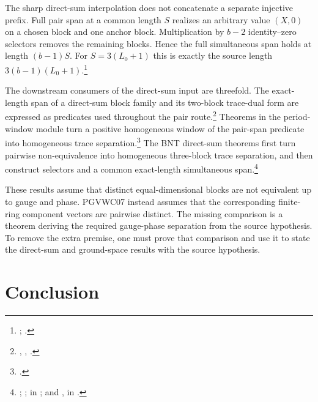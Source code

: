 \documentclass{article}
\begin{document}
The sharp direct-sum interpolation does not concatenate a separate injective
prefix. Full pair span at a common length $S$ realizes an arbitrary value
$(X,0)$ on a chosen block and one anchor block. Multiplication by $b-2$
identity--zero selectors removes the remaining blocks. Hence the full
simultaneous span holds at length $(b-1)S$. For
$S=3(L_0+1)$ this is exactly the source length
$3(b-1)(L_0+1)$.\footnote{%
;
.}

The downstream consumers of the direct-sum input are threefold. The exact-length
span of a direct-sum block family and its two-block trace-dual form are expressed
as predicates used throughout the pair route.\footnote{%
, ,
.}
Theorems in the period-window module turn a positive homogeneous window of
the pair-span predicate into homogeneous trace separation.\footnote{%
.}
The BNT direct-sum theorems first turn pairwise non-equivalence into
homogeneous three-block trace separation, and then construct selectors and a
common exact-length simultaneous span.\footnote{%
;
;
in ; and
,
in .}

These results assume that distinct equal-dimensional blocks are not equivalent
up to gauge and phase. PGVWC07 instead assumes that the corresponding
finite-ring component vectors are pairwise distinct. The missing comparison is
a theorem deriving the required gauge-phase separation from the source
hypothesis. To remove the extra premise, one must prove that comparison and use
it to state the direct-sum and ground-space results with the source hypothesis.

\section{Conclusion}
\end{document}

